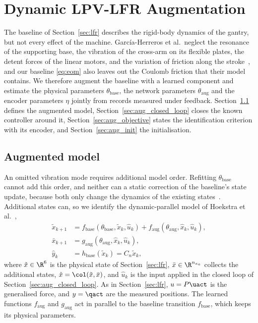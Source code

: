 \section{Dynamic LPV-LFR Augmentation}\label{sec:augmentation}

The baseline of Section~\ref{sec:lfr} describes the rigid-body dynamics of
the gantry, but not every effect of the machine.
Garc\'ia-Herreros et al.\ neglect the resonance of the supporting base, the
vibration of the cross-arm on its flexible plates, the detent forces of the
linear motors, and the variation of friction along the
stroke~\cite[Sec.~2.4]{garcia2013model}, and our baseline \eqref{eq:eom}
also leaves out the Coulomb friction that their model contains.
We therefore augment the baseline with a learned component and estimate the
physical parameters $\theta_{\mathrm{base}}$, the network parameters
$\theta_{\mathrm{aug}}$ and the encoder parameters $\eta$ jointly from
records measured under feedback.
Section~\ref{sec:aug_structure} defines the augmented model,
Section~\ref{sec:aug_closed_loop} closes the known controller around it,
Section~\ref{sec:aug_objective} states the identification criterion with
its encoder, and Section~\ref{sec:aug_init} the initialisation.

\subsection{Augmented model}\label{sec:aug_structure}
An omitted vibration mode requires additional model order.
Refitting $\theta_{\mathrm{base}}$ cannot add this order, and neither can a
static correction of the baseline's state update, because both only change
the dynamics of the existing states~\cite[Sec.~2]{hoekstra2025lfr}.
Additional states can, so we identify the dynamic-parallel model of Hoekstra
et al.~\cite[Table~1]{hoekstra2026lfr},
\begin{equation}
\begin{aligned}
 \tilde x_{k+1}
 &=f_{\mathrm{base}}(\theta_{\mathrm{base}},\tilde x_k,\hat u_k)
   +f_{\mathrm{aug}}(\theta_{\mathrm{aug}},\hat x_k,\hat u_k),\\
 \bar x_{k+1}
 &=g_{\mathrm{aug}}(\theta_{\mathrm{aug}},\hat x_k,\hat u_k),\\
 \hat y_k&=h_{\mathrm{base}}(\tilde x_k)=C_n\tilde x_k ,
\end{aligned}
\label{eq:aug_transition}
\end{equation}
where $\tilde x\in\R^6$ is the physical state of Section~\ref{sec:lfr},
$\bar x\in\R^{n_{x_a}}$ collects the additional states,
$\hat x=\col(\tilde x,\bar x)$, and $\hat u_k$ is the input applied in the
closed loop of Section~\ref{sec:aug_closed_loop}.
As in Section~\ref{sec:lfr}, $u=P\uact$ is the generalised force, and
$y=\qact$ are the measured positions.
The learned functions $f_{\mathrm{aug}}$ and $g_{\mathrm{aug}}$ act in
parallel to the baseline transition $f_{\mathrm{base}}$, which keeps its
physical parameters.


